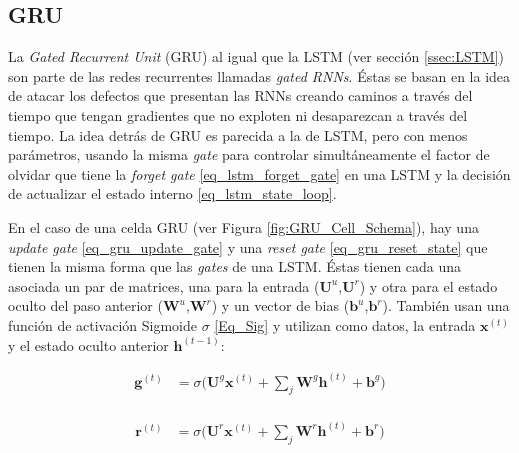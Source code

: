 \documentclass[spanish]{article}
\theoremstyle{definition}
\theoremstyle{remark}
\numberwithin{equation}{section}
\numberwithin{equation}{section} %
\begin{document}
\subsection{GRU}
\label{ssec:GRU}
La \textit{Gated Recurrent Unit} (GRU)\cite{cho2014learning}  al igual que la LSTM \cite{hochreiter1997long} (ver sección \ref{ssec:LSTM}) son parte de las redes recurrentes llamadas \textit{gated RNNs}. Éstas se basan en la idea de atacar los defectos que presentan las RNNs creando caminos a través del tiempo que tengan gradientes que no exploten ni desaparezcan a través del tiempo. La idea detrás de GRU es parecida a la de LSTM, pero con menos parámetros, usando la misma \textit{gate} para controlar simultáneamente el factor de olvidar que tiene la \textit{forget gate} \eqref{eq_lstm_forget_gate} en una LSTM y la decisión de actualizar el estado interno \eqref{eq_lstm_state_loop}.  \par
En el caso de una celda GRU (ver Figura \ref{fig:GRU_Cell_Schema}), hay una \textit{update gate} \eqref{eq_gru_update_gate} y una \textit{reset gate} \eqref{eq_gru_reset_state} que tienen la misma forma que las \textit{gates} de una LSTM. Éstas tienen cada una asociada un par de matrices, una para la entrada ($\boldsymbol{U}^u$,$\boldsymbol{U}^r$) y otra para el estado oculto del paso anterior ($\boldsymbol{W}^u$,$\boldsymbol{W}^r$) y un vector de bias ($\boldsymbol{b}^u$,$\boldsymbol{b}^r$). También usan una función de activación Sigmoide $\sigma$ \eqref{Eq_Sig} y utilizan como datos, la entrada $\boldsymbol{x}^{(t)}$ y el estado oculto anterior $\boldsymbol{h}^{(t-1)}$: \par
\begin{equation}
\label{eq_gru_update_gate}
\begin{split}
 \boldsymbol{g}^{(t)}  &=\sigma \Bigg( \boldsymbol{U}^g \boldsymbol{x}^{(t)} + \sum_j \boldsymbol{W}^g \boldsymbol{h}^{(t)} +\boldsymbol{b}^g\Bigg) \\
 \end{split}
 \end{equation} \par
  \begin{equation}
\label{eq_gru_reset_state}
\begin{split}
 \boldsymbol{r}^{(t)}   &=\sigma \Bigg( \boldsymbol{U}^r \boldsymbol{x}^{(t)} + \sum_j \boldsymbol{W}^r \boldsymbol{h}^{(t)} +\boldsymbol{b}^r\Bigg) \\
 \end{split}
 \end{equation} \par
\end{document}
